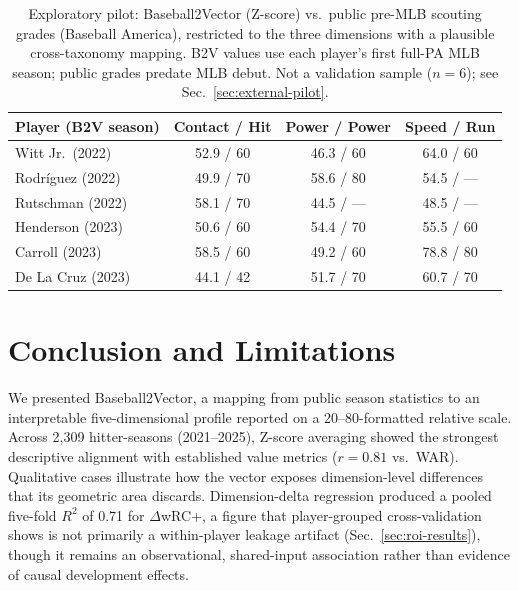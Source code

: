 \documentclass[10pt,twocolumn,letterpaper]{article}
\begin{document}
\begin{table}[t]
\centering
\caption{Exploratory pilot: Baseball2Vector (Z-score) vs.\ public pre-MLB scouting grades (Baseball America), restricted to the three dimensions with a plausible cross-taxonomy mapping. B2V values use each player's first full-PA MLB season; public grades predate MLB debut. Not a validation sample ($n=6$); see Sec.~\ref{sec:external-pilot}.}
\label{tab:pilot}
\scriptsize
\setlength{\tabcolsep}{3pt}
\begin{tabular}{lccc}
\toprule
Player (B2V season) & Contact / Hit & Power / Power & Speed / Run \\
\midrule
Witt Jr.\ (2022)      & 52.9 / 60 & 46.3 / 60 & 64.0 / 60 \\
Rodr\'iguez (2022)    & 49.9 / 70 & 58.6 / 80 & 54.5 / --- \\
Rutschman (2022)      & 58.1 / 70 & 44.5 / --- & 48.5 / --- \\
Henderson (2023)      & 50.6 / 60 & 54.4 / 70 & 55.5 / 60 \\
Carroll (2023)        & 58.5 / 60 & 49.2 / 60 & 78.8 / 80 \\
De La Cruz (2023)     & 44.1 / 42 & 51.7 / 70 & 60.7 / 70 \\
\bottomrule
\end{tabular}
\end{table}

\section{Conclusion and Limitations}
\label{sec:conclusion}

We presented Baseball2Vector, a mapping from public season statistics to an interpretable five-dimensional profile reported on a 20--80-formatted relative scale. Across 2{,}309 hitter-seasons (2021--2025), Z-score averaging showed the strongest descriptive alignment with established value metrics ($r=0.81$ vs.\ WAR). Qualitative cases illustrate how the vector exposes dimension-level differences that its geometric area discards. Dimension-delta regression produced a pooled five-fold $R^2$ of 0.71 for $\Delta$wRC+, a figure that player-grouped cross-validation shows is not primarily a within-player leakage artifact (Sec.~\ref{sec:roi-results}), though it remains an observational, shared-input association rather than evidence of causal development effects.
\end{document}
